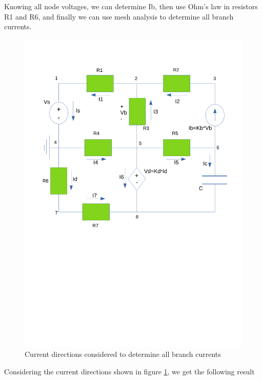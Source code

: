 \par Knowing all node voltages, we can determine Ib, then use Ohm's law in resistors R1 and R6, and finally we can use mesh analysis to determine all branch currents.

\begin{figure}[H] \centering
\includegraphics[width=0.8\linewidth]{Esquema1_currents_teo.pdf}
\caption{Current directions considered to determine all branch currents}
\label{fig:Esquema1_currents_teo}
\end{figure}

\par Considering the current directions shown in figure \ref{fig:Esquema1_currents_teo}, we get the following result

\begin{table}[H]
\centering
\begin{tabularx}{0.8\textwidth} {
  | >{\raggedright\arraybackslash}X
  | >{\raggedleft\arraybackslash}X | }
 \hline
 
\end{tabularx}
\end{table}


	


